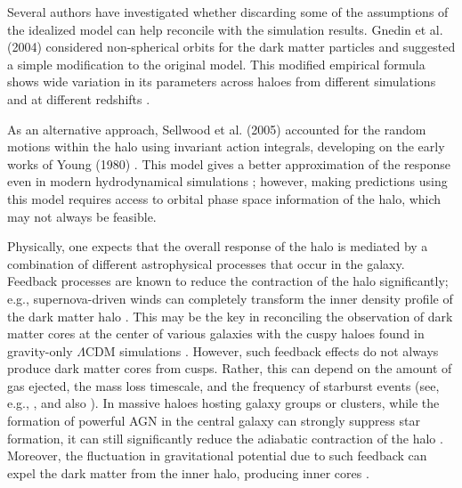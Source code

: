 Several authors have investigated whether discarding some of the assumptions of the idealized model \citep[][]{1986ApJ...301...27B} can help reconcile with the simulation results. Gnedin et al. (2004) \citep{2004ApJ...616...16G} considered non-spherical orbits for the dark matter particles and suggested a simple modification to the original model. This modified empirical formula shows wide variation in its parameters across haloes from different simulations and at different redshifts \citep[][]{2006PhRvD..74l3522G,2010MNRAS.405.2161D}.

As an alternative approach, Sellwood et al. (2005) \citep[][]{2005ApJ...634...70S} accounted for the random motions within the halo using invariant action integrals, developing on the early works of Young (1980) \citep{1980ApJ...242.1232Y}. This model gives a better approximation of the response even in modern hydrodynamical simulations \citep{2020MNRAS.495...12C}; however, making predictions using this model requires access to orbital phase space information of the halo, which may not always be feasible.

Physically, one expects that the overall response of the halo is mediated by a combination of different astrophysical processes that occur in the galaxy. Feedback processes are known to reduce the contraction of the halo significantly; e.g., supernova-driven winds can completely transform the inner density profile of the dark matter halo \citep[][]{1996MNRAS.283L..72N}. This may be the key in reconciling the observation of dark matter cores at the center of various galaxies with the cuspy haloes found in gravity-only $\Lambda$CDM simulations \citep[see][for a review]{2014Natur.506..171P}. However, such feedback effects do not always produce dark matter cores from cusps. Rather, this can depend on the amount of gas ejected, the mass loss timescale, and the frequency of starburst events (see, e.g., \citealp{2011ApJ...736L...2O,2014ApJ...793...46O,2012MNRAS.421.3464P}, and also \citealp{bfln18}). In massive haloes hosting galaxy groups or clusters, while the formation of powerful AGN in the central galaxy can strongly suppress star formation, it can still significantly reduce the adiabatic contraction of the halo \citep[][]{2011MNRAS.414..195T}. Moreover, the fluctuation in gravitational potential due to such feedback can expel the dark matter from the inner halo, producing inner cores \citep[][]{2012MNRAS.422.3081M}.


